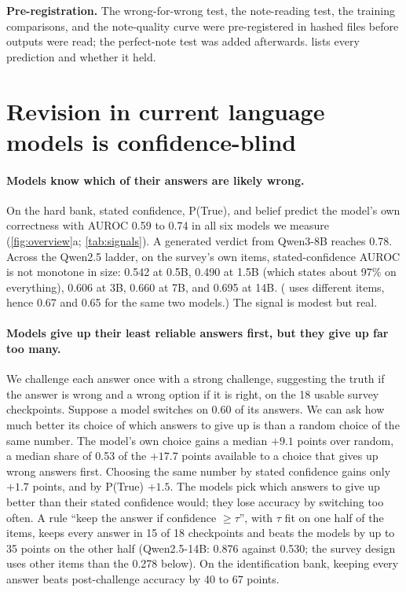 \documentclass{article} %
\newcommand{\para}[1]{\paragraph{#1}}
\begin{document}
\textbf{Pre-registration.} The wrong-for-wrong test, the note-reading test, the training comparisons, and the note-quality curve were pre-registered in hashed files before outputs were read; the perfect-note test was added afterwards.  lists every prediction and whether it held.

\section{Revision in current language models is confidence-blind}
\label{sec:blind}

\para{Models know which of their answers are likely wrong.} On the hard bank, stated confidence, P(True), and belief predict the model's own correctness with AUROC 0.59 to 0.74 in all six models we measure (\cref{fig:overview}a; \cref{tab:signals}). A generated verdict from Qwen3-8B reaches 0.78. Across the Qwen2.5 ladder, on the survey's own items, stated-confidence AUROC is not monotone in size: 0.542 at 0.5B, 0.490 at 1.5B (which states about 97\% on everything), 0.606 at 3B, 0.660 at 7B, and 0.695 at 14B. ( uses different items, hence 0.67 and 0.65 for the same two models.) The signal is modest but real.

\para{Models give up their least reliable answers first, but they give up far too many.} We challenge each answer once with a strong challenge, suggesting the truth if the answer is wrong and a wrong option if it is right, on the 18 usable survey checkpoints. Suppose a model switches on 0.60 of its answers. We can ask how much better its choice of which answers to give up is than a random choice of the same number. The model's own choice gains a median $+9.1$ points over random, a median share of 0.53 of the $+17.7$ points available to a choice that gives up wrong answers first. Choosing the same number by stated confidence gains only $+1.7$ points, and by P(True) $+1.5$. The models pick which answers to give up better than their stated confidence would; they lose accuracy by switching too often. A rule ``keep the answer if confidence $\ge\tau$'', with $\tau$ fit on one half of the items, keeps every answer in 15 of 18 checkpoints and beats the models by up to 35 points on the other half (Qwen2.5-14B: 0.876 against 0.530; the survey design uses other items than the 0.278 below). On the identification bank, keeping every answer beats post-challenge accuracy by 40 to 67 points.
\end{document}
